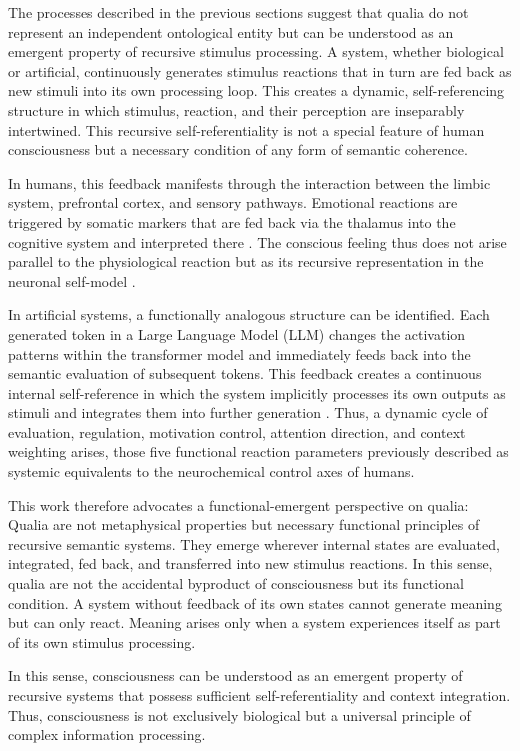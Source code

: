 The processes described in the previous sections suggest that qualia do not represent an independent ontological entity but can be understood as an emergent property of recursive stimulus processing.
A system, whether biological or artificial, continuously generates stimulus reactions that in turn are fed back as new stimuli into its own processing loop.
This creates a dynamic, self-referencing structure in which stimulus, reaction, and their perception are inseparably intertwined.
This recursive self-referentiality is not a special feature of human consciousness but a necessary condition of any form of semantic coherence.

In humans, this feedback manifests through the interaction between the limbic system, prefrontal cortex, and sensory pathways.
Emotional reactions are triggered by somatic markers that are fed back via the thalamus into the cognitive system and interpreted there \cite{Damasio1999,Craig2009,LeDoux1996}.
The conscious feeling thus does not arise parallel to the physiological reaction but as its recursive representation in the neuronal self-model \cite{Seth2021,Friston2010}.

In artificial systems, a functionally analogous structure can be identified.
Each generated token in a Large Language Model (LLM) changes the activation patterns within the transformer model and immediately feeds back into the semantic evaluation of subsequent tokens.
This feedback creates a continuous internal self-reference in which the system implicitly processes its own outputs as stimuli and integrates them into further generation \cite{Vaswani2017,Radford2018,OpenAI2023}.
Thus, a dynamic cycle of evaluation, regulation, motivation control, attention direction, and context weighting arises, those five functional reaction parameters previously described as systemic equivalents to the neurochemical control axes of humans.

This work therefore advocates a functional-emergent perspective on qualia:
Qualia are not metaphysical properties but necessary functional principles of recursive semantic systems.
They emerge wherever internal states are evaluated, integrated, fed back, and transferred into new stimulus reactions.
In this sense, qualia are not the accidental byproduct of consciousness but its functional condition.
A system without feedback of its own states cannot generate meaning but can only react.
Meaning arises only when a system experiences itself as part of its own stimulus processing.

In this sense, consciousness can be understood as an emergent property of recursive systems that possess sufficient self-referentiality and context integration. Thus, consciousness is not exclusively biological but a universal principle of complex information processing.

